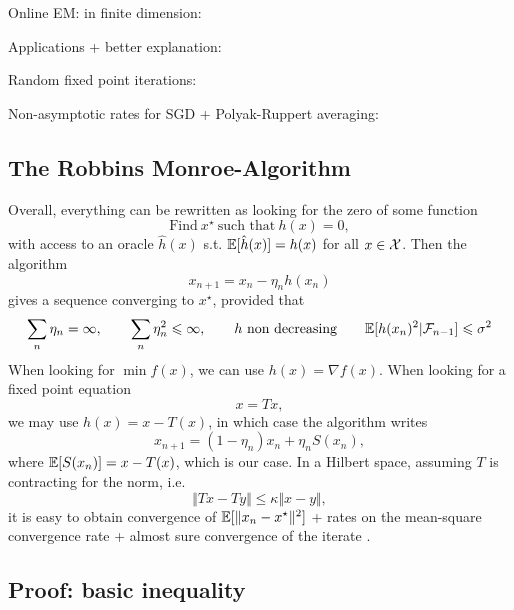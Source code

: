 \documentclass[a4paper, 10pt]{article}
\begin{document}
 Online EM: in finite dimension: 

 Applications + better explanation: 

 Random fixed point iterations: 

 Non-asymptotic rates for SGD + Polyak-Ruppert averaging: 

\subsection{The Robbins Monroe-Algorithm}
Overall, everything can be rewritten as looking for the zero of some function
\begin{equation}
    \text{Find}\:x^\star\:\text{such that}\:h(x) = 0,
\end{equation}
with access to an oracle 
$\hat h(x)$ s.t. $\mathbb{E}[\hat h(x)] = h(x)$ for all $x \in \mathcal{X}$. Then the algorithm
\begin{equation}
    x_{n+1} = x_n - \eta_n h(x_n)
\end{equation}
gives a sequence converging to $x^\star$, provided that
\begin{equation}
    \sum_n \eta_n = \infty,\qquad \sum_n \eta_n^2 \leqslant \infty,
    \qquad h\text{ non decreasing}\qquad \mathbb{E}[h(x_n)^2 | \mathcal{F}_{n-1} ] \leqslant \sigma^2
\end{equation}
When looking for $\min f(x)$, we can use $h(x) = \nabla f(x)$. When looking for a fixed point equation
\begin{equation}
    x = T x,
\end{equation}
we may use $h(x) = x - T(x)$, in which case the algorithm writes
\begin{equation}
    x_{n+1} = (1 - \eta_n) x_n + \eta_n S(x_n),
\end{equation}
where $\mathbb{E}[S(x_n)] = x - T(x)$, which is our case. In a Hilbert space, assuming $T$ is contracting for the norm, i.e.
\begin{equation}
    \Vert Tx - Ty \Vert \leq \kappa \Vert x - y \Vert,
\end{equation}
it is easy to obtain convergence of $\mathbb{E}[\Vert x_n  - x^\star \Vert^2]$ + rates on the mean-square convergence rate + almost sure convergence of the iterate \autocite{alber_stochastic_2012}.


\subsection{Proof: basic inequality}
\end{document}
